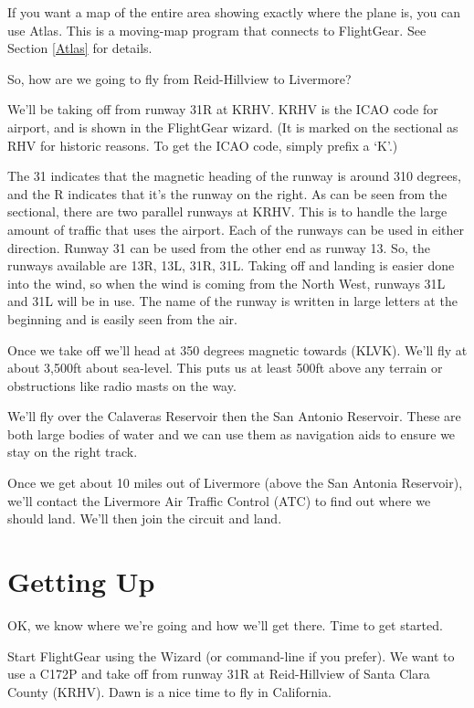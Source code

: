 If you want a map of the entire area showing exactly where the plane is,
you can use Atlas.
This is a moving-map program that connects to FlightGear. See Section \ref{Atlas} for details.

So, how are we going to fly from Reid-Hillview to Livermore?

We'll be taking off from runway 31R at KRHV. KRHV is the ICAO code
for  airport, and is shown in the FlightGear wizard.
(It is marked on the sectional as RHV for historic reasons.
To get the ICAO code, simply prefix a `K'.)

The 31 indicates that the magnetic heading of the runway is around 310 degrees,
and the R indicates that it's the runway on the right. As can be seen from the
sectional, there are two parallel runways at KRHV. This is to handle the large
amount of traffic that uses the airport. Each of the runways can be used in
either direction. Runway 31 can be used from the other end as runway 13.
So, the runways available are 13R, 13L, 31R, 31L. Taking off and landing
is easier done into the wind, so when the wind is coming from the North West,
runways 31L and 31L will be in use. The name of the runway is written in large
letters at the beginning and is easily seen from the air.

Once we take off we'll head at 350 degrees magnetic towards  (KLVK).
We'll fly at about 3,500ft about sea-level. This puts us at least 500ft above any
terrain or obstructions like radio masts on the way.

We'll fly over the Calaveras Reservoir then the San Antonio Reservoir. These are
both large bodies of water and we can use them as navigation aids to ensure we
stay on the right track.

Once we get about 10 miles out of Livermore (above the San Antonia Reservoir),
we'll contact the Livermore Air Traffic Control (ATC) to find out
where we should land. We'll then join the circuit and land.

\section{Getting Up}

OK, we know where we're going and how we'll get there. Time to get started.

Start FlightGear using the Wizard (or command-line if you prefer).
 We want to use a C172P and take off from runway 31R at Reid-Hillview of
 Santa Clara County (KRHV). Dawn is a nice time to fly in California.


